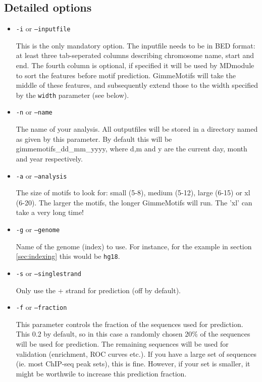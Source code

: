 \documentclass[10pt]{article}
\begin{document}
\subsection{Detailed options}
\begin{itemize}
\item 
\texttt{-i} or \texttt{--inputfile}

This is the only mandatory option. The inputfile needs to be in BED format: at least three tab-seperated columns describing chromosome name, start and end. The fourth column is optional, if specified it will be used by MDmodule to sort the features before motif prediction. GimmeMotifs will take the middle of these features, and subsequently extend those to the width specified by the \texttt{width} parameter (see below).

\item 
\texttt{-n} or \texttt{--name}

The name of your analysis. All outputfiles will be stored in a directory named as given by this parameter. By default this will be gimmemotifs\_dd\_mm\_yyyy, where d,m and y are the current day, month and year respectively.

\item 
\texttt{-a} or \texttt{--analysis}

The size of motifs to look for: small (5-8), medium (5-12), large (6-15) or xl (6-20). The larger the motifs, the longer GimmeMotifs will run. The 'xl' can take a very long time!

\item 
\texttt{-g} or \texttt{--genome}

Name of the genome (index) to use. For instance, for the example in section \ref{sec:indexing} this would be \texttt{hg18}.

\item 
\texttt{-s} or \texttt{--singlestrand}

Only use the + strand for prediction (off by default).

\item 
\texttt{-f} or \texttt{--fraction}

This parameter controls the fraction of the sequences used for prediction. This 0.2 by default, so in this case a randomly chosen 20\% of the sequences will be used for prediction. The remaining sequences will be used for validation (enrichment, ROC curves etc.). If you have a large set of sequences (ie. most ChIP-seq peak sets), this is fine. However, if your set is smaller, it might be worthwile to increase this prediction fraction.


\end{itemize}
\end{document}
